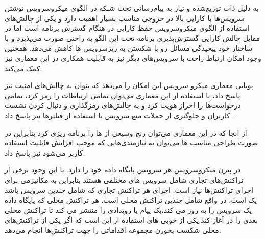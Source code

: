 به دلیل ذات توزیع‌شده و نیاز به پیام‌رسانی تحت شبکه در الگوی میکروسرویس نوشتن سرویس‌ها با کارایی بالا در خروجی مناسب بسیار اهمیت دارد و یکی از چالش‌های استفاده از الگوی میکروسرویس حفظ کارایی در هنگام گسترش برنامه است اما در مقابل چالش کارایی گسترش‌پذیری برنامه تحت این الگو به راحتی صورت می‌پذیرد و با ساختار خود پیچیدگی مسائل رو با شکستن به ریز‌سرویس ها کاهش می‌دهد. همچنین وجود امکان ارتباط راحت با سرویس‌های دیگر نیز به قابلیت همکاری در این معماری نیز کمک می‌کند.

پویایی معماری میکرو سرویس این امکان را می‌دهد که بتوان به چالش‌های امنیت نیز پاسخ داد، با استفاده از این معماری می‌توان تمامی ارتباطات را رمز کرد، تمامی درخواست‌ها را احراز هویت کرد و به چالش‌های رمزگذاری و دنبال کردن نشست کاربران و جلوگیری از حملات منع سرویس با استفاده از فیلترها نیز پاسخ داد \cite{micro_secure} .

از انجا که در این معماری می‌توان رنج وسیعی از  ها را برنامه ریزی کرد بنابراین در صورت طراحی مناسب  ها می‌توان به نیازمندی‌هایی که موجب افزایش قابلیت استفاده کاربر می‌شود نیز پاسخ داد.

در پترن میکروسرویس هر سرویس  پایگاه داده  خود را دارد. با این وجود برخی از تراکنش‌های تجاری شامل سرویس های مختلفی هستند بنابراین به مکانیزمی برای اجرای تراکنش‌ها نیاز است. اجرای هر تراکنش تجاری که شامل چندین سرویس باشد یک  است، در واقع  شامل چندین تراکنش محلی است. هر تراکنش محلی که پایگاه داده یک سرویس را به روز می کند،یک پیام یا رویدادی را منتشر می کند تا تراکنش محلی بعدی را در  آغاز کند.یکی از خوبی های استفاده از  این است که اگر یکی از تراکنش‌های محلی شکست بخورن  مجموعه اقداماتی را جهت  تراکنش‌ها انجام می‌دهد.\cite{saga}
